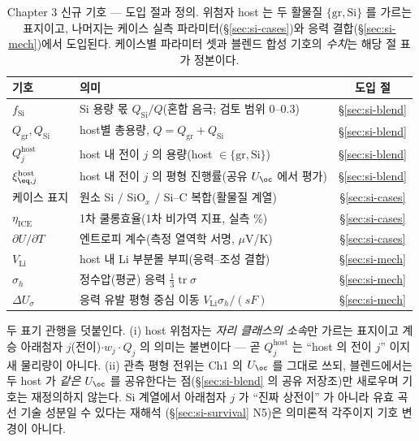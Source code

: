 \begin{table}[h]
\centering\footnotesize
\renewcommand{\arraystretch}{1.3}
\caption{Chapter 3 신규 기호 --- 도입 절과 정의. 위첨자 host 는 두 활물질 $\{\mathrm{gr},\mathrm{Si}\}$ 를
가르는 표지이고, 나머지는 케이스 실측 파라미터(\S\ref{sec:si-cases})와 응력 결합(\S\ref{sec:si-mech})에서
도입된다. 케이스별 파라미터 셋과 블렌드 합성 기호의 \emph{수치}는 해당 절 표가 정본이다.}
\label{tab:si-notation}
\begin{tabular}{@{}l p{} c@{}}
\toprule
기호 & 의미 & 도입 절 \\
\midrule
$f_\mathrm{Si}$        & Si 용량 몫 $Q_\mathrm{Si}/Q$(혼합 음극; 검토 범위 $0$--$0.3$) & \S\ref{sec:si-blend} \\
$Q_\mathrm{gr},Q_\mathrm{Si}$ & host별 총용량, $Q=Q_\mathrm{gr}+Q_\mathrm{Si}$        & \S\ref{sec:si-blend} \\
$Q_j^{\mathrm{host}}$  & host 내 전이 $j$ 의 용량(host $\in\{\mathrm{gr},\mathrm{Si}\}$) & \S\ref{sec:si-blend} \\
$\xi_{\eq,j}^{\mathrm{host}}$ & host 내 전이 $j$ 의 평형 진행률(공유 $U_\oc$ 에서 평가)   & \S\ref{sec:si-blend} \\
케이스 표지            & 원소 Si $/$ SiO$_x$ $/$ Si--C 복합(활물질 계열)          & \S\ref{sec:si-cases} \\
$\eta_\mathrm{ICE}$    & 1차 쿨롱효율(1차 비가역 지표, 실측 \%)                    & \S\ref{sec:si-cases} \\
$\partial U/\partial T$& 엔트로피 계수(측정 열역학 서명, $\mu$V/K)                & \S\ref{sec:si-cases} \\
$V_\mathrm{Li}$        & host 내 Li 부분몰 부피(응력--조성 결합)                   & \S\ref{sec:si-mech} \\
$\sigma_h$             & 정수압(평균) 응력 $\tfrac13\operatorname{tr}\sigma$      & \S\ref{sec:si-mech} \\
$\Delta U_\sigma$      & 응력 유발 평형 중심 이동 $V_\mathrm{Li}\sigma_h/(sF)$     & \S\ref{sec:si-mech} \\
\bottomrule
\end{tabular}
\end{table}

두 표기 관행을 덧붙인다. (i) host 위첨자는 \emph{자리 클래스의 소속}만 가르는 표지이고 계승 아래첨자
$j$(전이)$\cdot w_j\cdot Q_j$ 의 의미는 불변이다 --- 곧 $Q_j^{\mathrm{host}}$ 는 ``host 의 전이 $j$'' 이지 새
물리량이 아니다. (ii) 관측 평형 전위는 Ch1 의 $U_\oc$ 를 그대로 쓰되, 블렌드에서는 두 host 가
\emph{같은} $U_\oc$ 를 공유한다는 점(\S\ref{sec:si-blend} 의 공유 저장조)만 새로우며 기호는 재정의하지
않는다. Si 계열에서 아래첨자 $j$ 가 ``진짜 상전이'' 가 아니라 유효 곡선 기술 성분일 수 있다는 재해석
(\S\ref{sec:si-survival} N5)은 의미론적 각주이지 기호 변경이 아니다.

